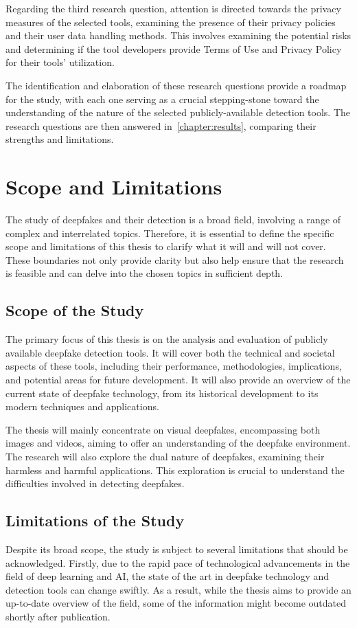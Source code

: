 Regarding the third research question, attention is directed towards the privacy measures of the
selected tools, examining the presence of their privacy policies and their user data handling
methods. This involves examining the potential risks and determining if the tool developers
provide Terms of Use and Privacy Policy for their tools' utilization.

The identification and elaboration of these research questions provide a roadmap for the study,
with each one serving as a crucial stepping-stone toward the understanding of the nature of
the selected publicly-available detection tools. The research questions are then answered in~\autoref{chapter:results},
comparing their strengths and limitations.

\section{Scope and Limitations}\label{chapter:scope}
The study of deepfakes and their detection is a broad field, involving a range of complex and
interrelated topics. Therefore, it is essential to define the specific scope and
limitations of this thesis to clarify what it will and will not cover. These boundaries
not only provide clarity but also help ensure that the research is feasible and can delve
into the chosen topics in sufficient depth.

\subsection{Scope of the Study}
The primary focus of this thesis is on the analysis and evaluation of publicly available
deepfake detection tools. It will cover both the technical and societal aspects of these
tools, including their performance, methodologies, implications, and potential areas for
future development. It will also provide an overview of the current state of deepfake
technology, from its historical development to its modern techniques and applications.

The thesis will mainly concentrate on visual deepfakes, encompassing both images and
videos, aiming to offer an understanding of the deepfake environment. The
research will also explore the dual nature of deepfakes, examining their harmless
and harmful applications. This exploration is crucial to understand the
difficulties involved in detecting deepfakes.

\subsection{Limitations of the Study}
Despite its broad scope, the study is subject to several limitations that should be
acknowledged. Firstly, due to the rapid pace of technological advancements in the field
of deep learning and \ac{AI}, the state of the art in deepfake technology and detection tools
can change swiftly. As a result, while the thesis aims to provide an up-to-date overview
of the field, some of the information might become outdated shortly after publication.

